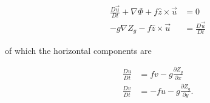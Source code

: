 \begin{align}
    \frac{D \vec{u}}{Dt} + \nabla \Phi + f \hat{z} \times \vec{u} &= 0 \\
    - g \nabla Z_g - f \hat{z} \times \vec{u} &= \frac{D \vec{u}}{Dt}
\end{align}

of which the horizontal components are

\begin{align}
    \frac{Du}{Dt} &= fv - g \frac{\partial Z_g}{\partial x} \label{eq:uvelocity} \\
    \frac{Dv}{Dt} &= -fu - g \frac{\partial Z_g}{\partial y}. \label{eq:vvelocity}
\end{align}

